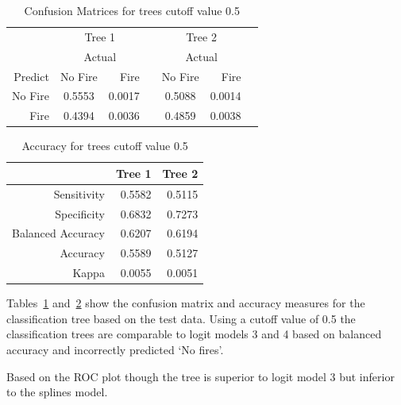 \documentclass[11pt,a4paper]{article}
\begin{document}
\begin{table}
  \centering

  \begin{tabular}{rcrrcrr}
    & \multicolumn{2}{c}{Tree 1} &
    & \multicolumn{2}{c}{Tree 2} & \\
    \cmidrule{2-3}\cmidrule{5-6}
    & \multicolumn{2}{c}{Actual} &
    & \multicolumn{2}{c}{Actual} &  \\
    Predict & No Fire & Fire   & & No Fire & Fire\\
    \cmidrule{2-3}\cmidrule{5-6}
    No Fire & 0.5553  & 0.0017 & & 0.5088  & 0.0014 \\
    Fire    & 0.4394  & 0.0036 & & 0.4859  & 0.0038 \\
    \cmidrule{2-3}\cmidrule{5-6}
  \end{tabular}
  \caption{Confusion Matrices for trees cutoff value 0.5}
  \label{table:tcm2}
\end{table}


\begin{table}
  \centering
  \begin{tabular}{rrr}
    \toprule
                      & Tree 1 & Tree 2 \\
    \midrule
    Sensitivity       & 0.5582 & 0.5115 \\
    Specificity       & 0.6832 & 0.7273 \\
    Balanced Accuracy & 0.6207 & 0.6194 \\
    Accuracy          & 0.5589 & 0.5127 \\
    Kappa             & 0.0055 & 0.0051 \\
    \bottomrule
  \end{tabular}
  \caption{Accuracy for trees cutoff value 0.5}
  \label{table:tacc2}
\end{table}

Tables~\ref{table:tcm2} and~\ref{table:tacc2} show the confusion matrix and accuracy measures for the classification tree based on the test data. Using a cutoff value of 0.5 the classification trees are comparable to logit models 3 and 4 based on balanced accuracy and incorrectly predicted `No fires'.


Based on the ROC plot though the tree is superior to logit model 3 but inferior to the splines model.
\end{document}
